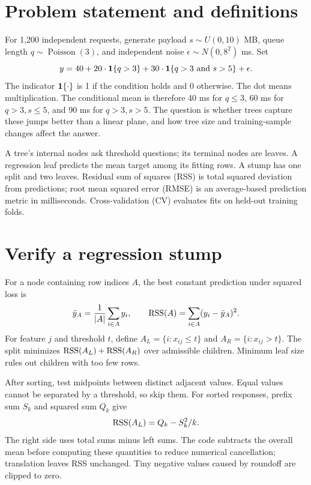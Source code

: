 


\section*{Problem statement and definitions}
For 1,200 independent requests, generate payload $s\sim U(0,10)$ MB, queue length $q\sim\operatorname{Poisson}(3)$, and independent noise $\epsilon\sim N(0,8^2)$ ms. Set
\[y=40+20\cdot\mathbf{1}\{q>3\}+30\cdot\mathbf{1}\{q>3\text{ and }s>5\}+\epsilon.\]
The indicator $\mathbf{1}\{\cdot\}$ is 1 if the condition holds and 0 otherwise. The dot means multiplication. The conditional mean is therefore 40 ms for $q\le3$, 60 ms for $q>3,s\le5$, and 90 ms for $q>3,s>5$.
The question is whether trees capture these jumps better than a linear plane, and how tree size and training-sample changes affect the answer.

A tree's internal nodes ask threshold questions; its terminal nodes are leaves. A regression leaf predicts the mean target among its fitting rows. A stump has one split and two leaves. Residual sum of squares (RSS) is total squared deviation from predictions; root mean squared error (RMSE) is an average-based prediction metric in milliseconds. Cross-validation (CV) evaluates fits on held-out training folds.

\section{Verify a regression stump}
For a node containing row indices $A$, the best constant prediction under squared loss is
\[\bar y_A=\frac1{|A|}\sum_{i\in A}y_i,\qquad
\operatorname{RSS}(A)=\sum_{i\in A}(y_i-\bar y_A)^2.\]
For feature $j$ and threshold $t$, define $A_L=\{i:x_{ij}\le t\}$ and $A_R=\{i:x_{ij}>t\}$. The split minimizes $\operatorname{RSS}(A_L)+\operatorname{RSS}(A_R)$ over admissible children. Minimum leaf size rules out children with too few rows.

After sorting, test midpoints between distinct adjacent values. Equal values cannot be separated by a threshold, so skip them. For sorted responses, prefix sum $S_k$ and squared sum $Q_k$ give
\[\operatorname{RSS}(A_L)=Q_k-S_k^2/k.\]
The right side uses total sums minus left sums. The code subtracts the overall mean before computing these quantities to reduce numerical cancellation; translation leaves RSS unchanged. Tiny negative values caused by roundoff are clipped to zero.

